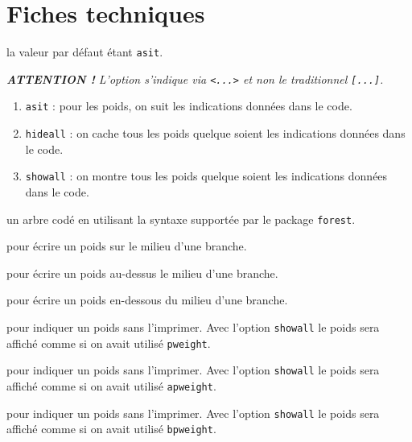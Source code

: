 \documentclass[12pt,a4paper]{article}
\begin{document}

\section{Fiches techniques}



\IDoption{} la valeur par défaut étant \verb#asit#.
            
\smallskip

\phantom{\IDoption{}}\emph{\textbf{ATTENTION !} L'option s'indique via \texttt{<...>} et non le traditionnel \texttt{[...]}.}

\begin{enumerate}
    \item \verb#asit# : pour les poids, on suit les indications données dans le code.

    \item \verb#hideall# : on cache tous les poids quelque soient les indications données dans le code.

    \item \verb#showall# : on montre tous les poids quelque soient les indications données dans le code.
\end{enumerate}

\Content{} un arbre codé en utilisant la syntaxe supportée par le package \verb#forest#.

\extraspace

  pour écrire un poids sur le milieu d'une branche.

 pour écrire un poids au-dessus le milieu d'une branche.

 pour écrire un poids en-dessous du milieu d'une branche.

\extraspace

 pour indiquer un poids sans l'imprimer.
Avec l'option \verb#showall# le poids sera affiché comme si on avait utilisé \verb#pweight#.

 pour indiquer un poids sans l'imprimer.
Avec l'option \verb#showall# le poids sera affiché comme si on avait utilisé \verb#apweight#.

 pour indiquer un poids sans l'imprimer.
Avec l'option \verb#showall# le poids sera affiché comme si on avait utilisé \verb#bpweight#.
\end{document}
